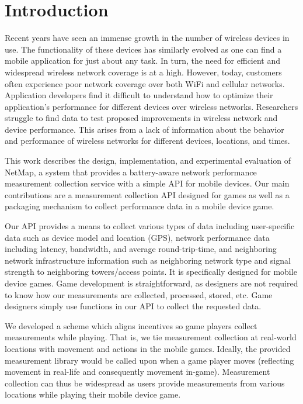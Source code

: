 \section{Introduction}
\label{s:intro}


Recent years have seen an immense growth in the number of wireless devices in use. The functionality of these devices has similarly evolved as one can find a mobile application for just about any task. In turn, the need for efficient and widespread wireless network coverage is at a high. However, today, customers often experience poor network coverage over both WiFi and cellular networks. Application developers find it difficult to understand how to optimize their application's performance for different devices over wireless networks. Researchers struggle to find data to test proposed improvements in wireless network and device performance. This arises from a lack of information about the behavior and performance of wireless networks for different devices, locations, and times. 

This work describes the design, implementation, and experimental evaluation of NetMap, a system that provides a battery-aware network performance measurement collection service with a simple API for mobile devices. Our main contributions are a measurement collection API designed for games as well as a packaging mechanism to collect performance data in a mobile device game. 

Our API provides a means to collect various types of data including user-specific data such as device model and location (GPS), network performance data including latency, bandwidth, and average round-trip-time, and neighboring network infrastructure information such as neighboring network type and signal strength to neighboring towers/access points. It is specifically designed for mobile device games. Game development is straightforward, as designers are not required to know how our measurements are collected, processed, stored, etc. Game designers simply use functions in our API to collect the requested data.

We developed a scheme which aligns incentives so game players collect measurements while playing. That is, we tie measurement collection at real-world locations with movement and actions in the mobile games. Ideally, the provided measurement library would be called upon when a game player moves (reflecting movement in real-life and consequently movement in-game). Measurement collection can thus be widespread as users provide measurements from various locations while playing their mobile device game.

